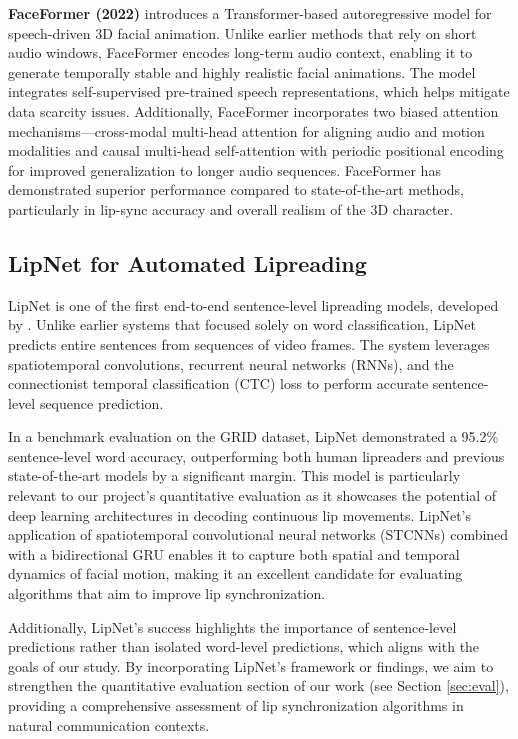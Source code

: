 \documentclass[12pt]{article}
\begin{document}
\label{ref:faceformer} \textbf{FaceFormer (2022)} \cite{Fan2022} introduces a Transformer-based autoregressive model for speech-driven 3D facial animation. Unlike earlier methods that rely on short audio windows, FaceFormer encodes long-term audio context, enabling it to generate temporally stable and highly realistic facial animations. The model integrates self-supervised pre-trained speech representations, which helps mitigate data scarcity issues. Additionally, FaceFormer incorporates two biased attention mechanisms—cross-modal multi-head attention for aligning audio and motion modalities and causal multi-head self-attention with periodic positional encoding for improved generalization to longer audio sequences. FaceFormer has demonstrated superior performance compared to state-of-the-art methods, particularly in lip-sync accuracy and overall realism of the 3D character.

\subsection{LipNet for Automated Lipreading}
\label{ref:lipnet}
LipNet is one of the first end-to-end sentence-level lipreading models, developed by \cite{AssaelLIPNET:LIPREADING}. Unlike earlier systems that focused solely on word classification, LipNet predicts entire sentences from sequences of video frames. The system leverages spatiotemporal convolutions, recurrent neural networks (RNNs), and the connectionist temporal classification (CTC) loss to perform accurate sentence-level sequence prediction.

In a benchmark evaluation on the GRID dataset, LipNet demonstrated a 95.2\% sentence-level word accuracy, outperforming both human lipreaders and previous state-of-the-art models by a significant margin. This model is particularly relevant to our project’s quantitative evaluation as it showcases the potential of deep learning architectures in decoding continuous lip movements. LipNet's application of spatiotemporal convolutional neural networks (STCNNs) combined with a bidirectional GRU enables it to capture both spatial and temporal dynamics of facial motion, making it an excellent candidate for evaluating algorithms that aim to improve lip synchronization.

Additionally, LipNet's success highlights the importance of sentence-level predictions rather than isolated word-level predictions, which aligns with the goals of our study. By incorporating LipNet's framework or findings, we aim to strengthen the quantitative evaluation section of our work (see Section \ref{sec:eval}), providing a comprehensive assessment of lip synchronization algorithms in natural communication contexts.
\end{document}
